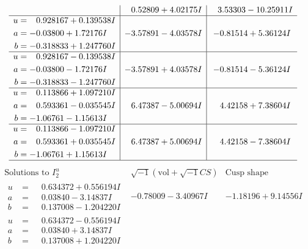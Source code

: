\documentclass[1p]{elsarticle_modified}
\theoremstyle{definition}
\newcommand{\I}{\sqrt{-1}}
\begin{document}
$$\begin{array}{c|c|c}
 & \phantom{-}0.52809 + 4.02175 I & \phantom{-}3.53303 - 10.25911 I \\ \hline\begin{aligned}
u &= \phantom{-}0.928167 + 0.139538 I \\
a &= -0.03800 + 1.72176 I \\
b &= -0.318833 + 1.247760 I\end{aligned}
 & -3.57891 - 4.03578 I & -0.81514 + 5.36124 I \\ \hline\begin{aligned}
u &= \phantom{-}0.928167 - 0.139538 I \\
a &= -0.03800 - 1.72176 I \\
b &= -0.318833 - 1.247760 I\end{aligned}
 & -3.57891 + 4.03578 I & -0.81514 - 5.36124 I \\ \hline\begin{aligned}
u &= \phantom{-}0.113866 + 1.097210 I \\
a &= \phantom{-}0.593361 - 0.035545 I \\
b &= -1.06761 - 1.15613 I\end{aligned}
 & \phantom{-}6.47387 - 5.00694 I & \phantom{-}4.42158 + 7.38604 I \\ \hline\begin{aligned}
u &= \phantom{-}0.113866 - 1.097210 I \\
a &= \phantom{-}0.593361 + 0.035545 I \\
b &= -1.06761 + 1.15613 I\end{aligned}
 & \phantom{-}6.47387 + 5.00694 I & \phantom{-}4.42158 - 7.38604 I\\
 \hline 
 \end{array}$$\newpage$$\begin{array}{c|c|c}  
\text{Solutions to }I^u_{2}& \I (\text{vol} + \sqrt{-1}CS) & \text{Cusp shape}\\
 \hline 
\begin{aligned}
u &= \phantom{-}0.634372 + 0.556194 I \\
a &= \phantom{-}0.03840 - 3.14837 I \\
b &= \phantom{-}0.137008 - 1.204220 I\end{aligned}
 & -0.78009 - 3.40967 I & -1.18196 + 9.14556 I \\ \hline\begin{aligned}
u &= \phantom{-}0.634372 - 0.556194 I \\
a &= \phantom{-}0.03840 + 3.14837 I \\
b &= \phantom{-}0.137008 + 1.204220 I\end{aligned}

\end{array}$$
\end{document}
